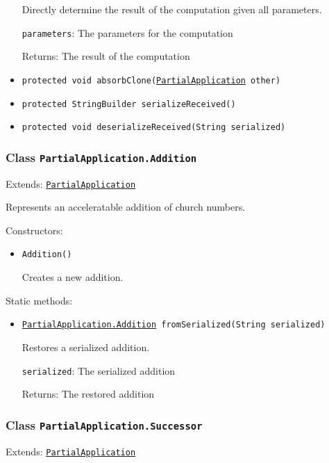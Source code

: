 \begin{itemize}
Directly determine the result of the computation given all parameters.

\texttt{parameters}: The parameters for the computation

Returns: The result of the computation

\item \texttt{protected void absorbClone(\hyperref[type:edu.kit.wavelength.client.model.term.PartialApplication]{PartialApplication} other)}



\item \texttt{protected StringBuilder serializeReceived()}



\item \texttt{protected void deserializeReceived(String serialized)}



\end{itemize}

\subsubsection{Class \texttt{PartialApplication.Addition}}
\label{type:edu.kit.wavelength.client.model.term.PartialApplication.Addition}
Extends: \texttt{\hyperref[type:edu.kit.wavelength.client.model.term.PartialApplication]{PartialApplication}}

Represents an acceleratable addition of church numbers.

Constructors:
\begin{itemize}
\item \texttt{Addition()}

Creates a new addition.

\end{itemize}

Static methods:
\begin{itemize}
\item \texttt{\hyperref[type:edu.kit.wavelength.client.model.term.PartialApplication.Addition]{PartialApplication.Addition} fromSerialized(String serialized)}

Restores a serialized addition.

\texttt{serialized}: The serialized addition

Returns: The restored addition

\end{itemize}

\subsubsection{Class \texttt{PartialApplication.Successor}}
\label{type:edu.kit.wavelength.client.model.term.PartialApplication.Successor}
Extends: \texttt{\hyperref[type:edu.kit.wavelength.client.model.term.PartialApplication]{PartialApplication}}

